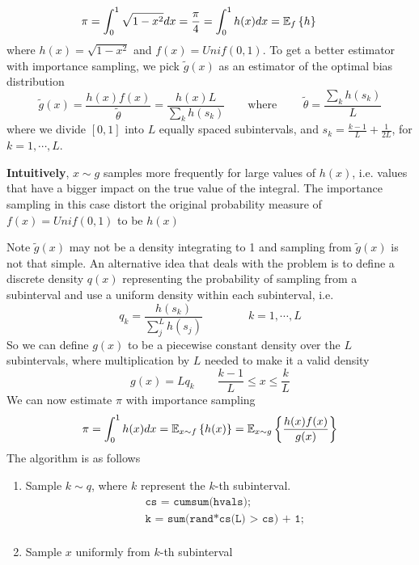 \documentclass[11pt]{article}
\begin{document}
\begin{enumerate}
\begin{enumerate}
        \[
            \pi = \int_0^1 \sqrt{1-x^2} dx = \frac{\pi}{4}  
            = \int_0^1 h(x) dx = \E[f]{h}
            \qquad 
        \]
        where $h(x) = \sqrt{1-x^2}$ and $f(x) = Unif(0,1)$. To get a better estimator with importance sampling, we pick $\tilde{g}(x)$ as an estimator of the optimal bias distribution
        \[
            \tilde{g}(x) = \frac{h(x)f(x)}{\tilde{\theta}}
            = \frac{h(x)L}{\sum_k h(s_k)}
            \qquad 
            \text{where }
            \qquad 
            \tilde{\theta} = \frac{\sum_k h(s_k)}{L}
        \]  
        where we divide $[0,1]$ into $L$ equally spaced subintervals, and $s_k = \textstyle \frac{k-1}{L} + \frac{1}{2L}$, for $k=1,\cdots, L$. 
        \begin{center}
            \textbf{Intuitively}, $x\sim g$ samples more frequently for large values of $h(x)$, i.e. values that have a bigger impact on the true value of the integral. The importance sampling in this case distort the original probability measure of $f(x) = Unif(0,1)$ to be $h(x)$
        \end{center}
        Note $\tilde{g}(x)$ may not be a density integrating to 1 and sampling from $\tilde{g}(x)$ is not that simple. An alternative idea that deals with the problem is to define a discrete density $q(x)$ representing the probability of sampling from a subinterval and use a uniform density within each subinterval, i.e. 
        \[
            q_k = \frac{h(s_k)}{\sum_j^L h(s_j)} 
            \qquad \qquad 
            k = 1,\cdots, L
        \]
        So we can define $g(x)$ to be a piecewise constant density over the $L$ subintervals, where multiplication by $L$ needed to make it a valid density 
        \[
            g(x) = Lq_k 
            \qquad 
            \frac{k-1}{L} \leq x \leq \frac{k}{L}
        \]
        We can now estimate $\pi$ with importance sampling
        \[
            \pi = \int_0^1 h(x) dx = \E[x\sim f]{h(x)} 
            = \E[x\sim g]{\frac{h(x)f(x)}{g(x)}}
        \]
        The algorithm is as follows 
        \begin{enumerate}
            \item Sample $k \sim q$, where $k$ represent the $k$-th subinterval. 
            \begin{align*}
                &\texttt{cs = cumsum(hvals);} \\ 
                &\texttt{k = sum(rand*cs(L) > cs) + 1;} \\ 
            \end{align*}
            \item Sample $x$ uniformly from $k$-th subinterval

\end{enumerate}
\end{enumerate}
\end{enumerate}
\end{document}
